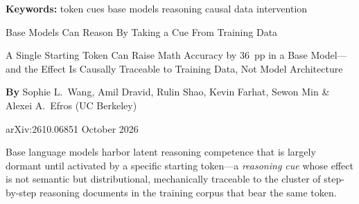 \documentclass[10pt,twocolumn]{article}
\begin{document}
\setlength{\parindent}{0pt}
\setlength{\parskip}{4pt}

{\small\color{keywordgray}\textbf{Keywords:}
  token cues \textbullet{}
  base models \textbullet{}
  reasoning \textbullet{}
  causal data intervention}\par\vspace{4pt}

{\LARGE\bfseries\raggedright
  Base Models Can Reason By Taking a Cue From Training Data}\par\vspace{4pt}

{\large\itshape\raggedright
  A Single Starting Token Can Raise Math Accuracy by 36~pp in a Base Model---and
  the Effect Is Causally Traceable to Training Data, Not Model Architecture}\par\vspace{6pt}

{\small\textbf{By} Sophie L.\ Wang, Amil Dravid, Rulin Shao, Kevin Farhat,
  Sewon Min \& Alexei A.\ Efros (UC Berkeley)}\par\vspace{2pt}

{\small\color{keywordgray}arXiv:2610.06851 \textbullet{} October 2026}
\par\vspace{2pt}\noindent{\color{rulered}\rule{\columnwidth}{0.6pt}}\vspace{6pt}

Base language models harbor latent reasoning competence that is largely dormant until
activated by a specific starting token---a \emph{reasoning cue} whose effect is
not semantic but distributional, mechanically traceable to the cluster of
step-by-step reasoning documents in the training corpus that bear the same token.
\end{document}
